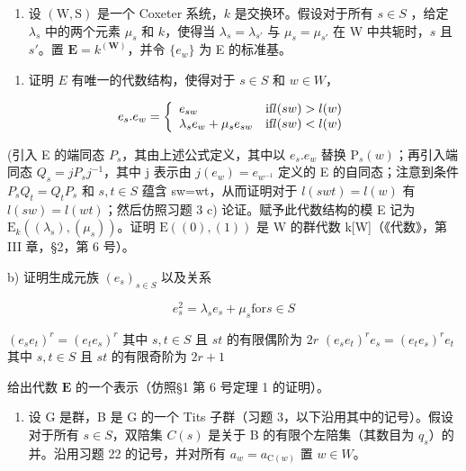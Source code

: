 \begin{enumerate}
\def\labelenumi{\arabic{enumi})}
\setcounter{enumi}{22}
\tightlist
\item
  设 \((\mathrm{W},\mathrm{S})\) 是一个 Coxeter 系统，\(k\) 是交换环。假设对于所有 \(s\in S\) ，给定 \(\lambda_{s}\) 中的两个元素 \(\mu_s\) 和 \(k\)，使得当 \(\lambda_{s} = \lambda_{s'}\) 与 \(\mu_{s} = \mu_{s'}\) 在 W 中共轭时，\(s\) 且 \(s'\)。置 \(\mathbf{E} = k^{(\mathbf{W})}\)，并令 \(\{e_w\}\) 为 E 的标准基。
\end{enumerate}

\begin{enumerate}
\def\labelenumi{\alph{enumi})}
\tightlist
\item
  证明 \(E\) 有唯一的代数结构，使得对于 \(s \in S\) 和 \(w \in W\)，
\end{enumerate}

\[
e _ {s}. e _ {w} = \left\{ \begin{array}{l l} e _ {s w} & \text {if} l (s w) > l (w) \\ \lambda_ {s} e _ {w} + \mu_ {s} e _ {s w} & \text {if} l (s w) <   l (w) \end{array} \right.
\]

(引入 E 的端同态 \(P_{s}\)，其由上述公式定义，其中以 \(e_{s}.e_{w}\) 替换 \(\mathrm{P}_{s}(w)\)；再引入端同态 \(Q_{s}=jP_{s}j^{-1}\)，其中 j 表示由 \(j(e_{w})=e_{w^{-1}}\) 定义的 E 的自同态；注意到条件 \(P_{s}Q_{t}=Q_{t}P_{s}\) 和 \(s,t\in S\) 蕴含 sw=wt，从而证明对于 \(l(swt)=l(w)\) 有 \(l(sw)=l(wt)\)；然后仿照习题 3 c) 论证。赋予此代数结构的模 E 记为 \(\mathrm{E}_{k}((\lambda_{s}),(\mu_{s}))\)。证明 \(\mathrm{E}((0),(1))\) 是 W 的群代数 k{[}W{]}（《代数》，第 III 章，§2，第 6 号）。

b) 证明生成元族 \((e_s)_{s\in S}\) 以及关系

\[
e _ {s} ^ {2} = \lambda_ {s} e _ {s} + \mu_ {s} \mathrm{for} s \in S
\]

\((e_s e_t)^r = (e_t e_s)^r\) 其中 \(s, t \in S\) 且 \(st\) 的有限偶阶为 \(2r\) \((e_s e_t)^r e_s = (e_t e_s)^r e_t\) 其中 \(s, t \in S\) 且 \(st\) 的有限奇阶为 \(2r + 1\)

给出代数 \(\mathbf{E}\) 的一个表示（仿照§1 第 6 号定理 1 的证明）。

\begin{enumerate}
\def\labelenumi{\arabic{enumi})}
\setcounter{enumi}{23}
\tightlist
\item
  设 G 是群，B 是 G 的一个 Tits 子群（习题 3，以下沿用其中的记号）。假设对于所有 \(s \in S\)，双陪集 \(C(s)\) 是关于 B 的有限个左陪集（其数目为 \(q_{s}\)）的并。沿用习题 22 的记号，并对所有 \(a_{w} = a_{\mathrm{C}(w)}\) 置 \(w \in W\)。
\end{enumerate}

